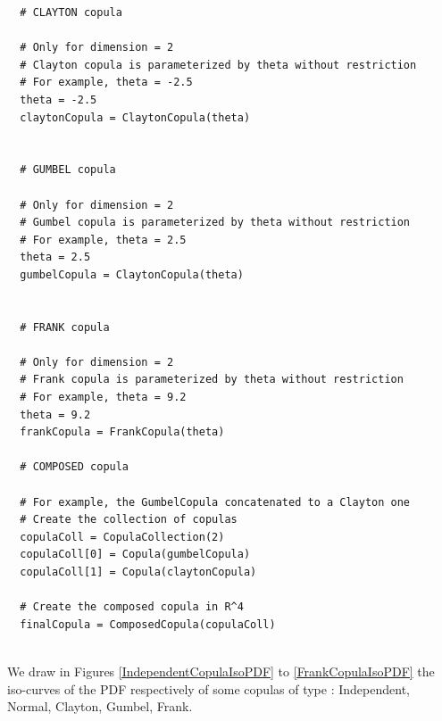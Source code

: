 \begin{lstlisting}
  # CLAYTON copula

  # Only for dimension = 2
  # Clayton copula is parameterized by theta without restriction
  # For example, theta = -2.5
  theta = -2.5
  claytonCopula = ClaytonCopula(theta)


  # GUMBEL copula

  # Only for dimension = 2
  # Gumbel copula is parameterized by theta without restriction
  # For example, theta = 2.5
  theta = 2.5
  gumbelCopula = ClaytonCopula(theta)


  # FRANK copula

  # Only for dimension = 2
  # Frank copula is parameterized by theta without restriction
  # For example, theta = 9.2
  theta = 9.2
  frankCopula = FrankCopula(theta)

  # COMPOSED copula

  # For example, the GumbelCopula concatenated to a Clayton one
  # Create the collection of copulas
  copulaColl = CopulaCollection(2)
  copulaColl[0] = Copula(gumbelCopula)
  copulaColl[1] = Copula(claytonCopula)

  # Create the composed copula in R^4
  finalCopula = ComposedCopula(copulaColl)
\end{lstlisting}
\textspace\\

We draw in Figures \ref{IndependentCopulaIsoPDF} to \ref{FrankCopulaIsoPDF} the iso-curves of the PDF respectively of some copulas of type : Independent, Normal, Clayton, Gumbel, Frank.




